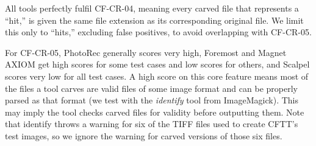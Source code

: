 All tools perfectly fulfil CF-CR-04, meaning every carved file that represents a ``hit,'' is given the same file extension as its corresponding original file.
We limit this only to ``hits,'' excluding false positives, to avoid overlapping with CF-CR-05.

For CF-CR-05, PhotoRec generally scores very high, Foremost and Magnet AXIOM get high scores for some test cases and low scores for others, and Scalpel scores very low for all test cases.
A high score on this core feature means most of the files a tool carves are valid files of some image format and can be properly parsed as that format (we test with the \emph{identify} tool from ImageMagick).
This may imply the tool checks carved files for validity before outputting them.
Note that identify throws a warning for six of the TIFF files used to create CFTT's test images, so we ignore the warning for carved versions of those six files.
